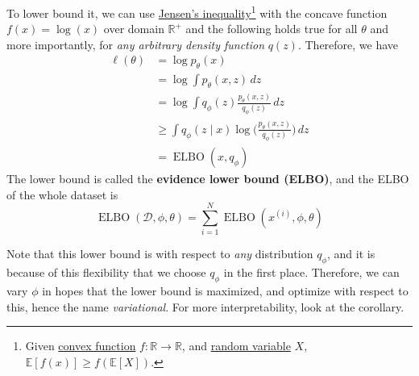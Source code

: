 \documentclass{article}
\DeclareMathOperator{\elbo}{ELBO}
\begin{document}
  \begin{definition}
    \label{def:evidence-lower-bound}
    To lower bound it, we can use \hyperref[com-thm:jensens-inequality]{Jensen's inequality}\footnote{Given \hyperref[mt-def:convex-function]{convex function} $f: \mathbb{R} \rightarrow \mathbb{R}$, and \hyperref[prob-def:random-variable]{random variable} $X$, $\mathbb{E}[f(x)] \geq f(\mathbb{E}[X])$.} with the concave function $f(x) = \log(x)$ over domain $\mathbb{R}^+$ and the following holds true for all $\theta$ and more importantly, for \textit{any arbitrary density function} $q(z)$. Therefore, we have 
    \begin{align}
      \ell(\theta) & = \log p_\theta (x) \\
                   & = \log \int p_\theta (x, z) \,dz \\
                   & = \log \int q_\phi (z) \frac{p_\theta (x, z)}{q_\phi (z)} \,dz \\ 
                   & \geq \int q_\phi (z \mid x) \log \bigg( \frac{p_\theta (x, z)}{q_\phi (z)} \bigg) \,dz \\  
                   & = \elbo(x, q_\phi)
    \end{align}
    The lower bound is called the \textbf{evidence lower bound (ELBO)}, and the ELBO of the whole dataset is 
    \begin{equation}
      \elbo(\mathcal{D}, \phi, \theta) = \sum_{i=1}^N \elbo(x^{(i)}, \phi, \theta)
    \end{equation}
  \end{definition} 

  Note that this lower bound is with respect to \textit{any} distribution $q_\phi$, and it is because of this flexibility that we choose $q_\phi$ in the first place. Therefore, we can vary $\phi$ in hopes that the lower bound is maximized, and optimize with respect to this, hence the name \textit{variational}. For more interpretability, look at the corollary. 
\end{document}
